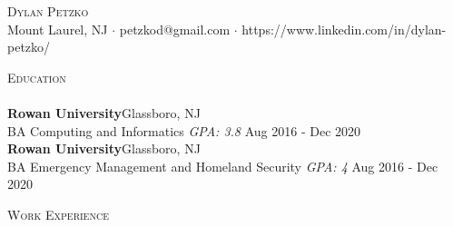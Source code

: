 \documentclass[letterpaper,11pt]{article}
\newcommand{\lineunder} {
    \vspace*{-8pt} \\
    \hspace*{-18pt} \hrulefill \\
}
\newcommand{\header} [1] {
    {\hspace*{-18pt}\vspace*{6pt} \textsc{#1}}
    \vspace*{-6pt} \lineunder
}
\begin{document}
\vspace*{-40pt}

    

\vspace*{-10pt}
\begin{center}
	{\Huge \scshape {Dylan Petzko}}\\
	Mount Laurel, NJ $\cdot$ petzkod@gmail.com $\cdot$ https://www.linkedin.com/in/dylan-petzko/\\
\end{center}

\header{Education}
\textbf{Rowan University}\hfill Glassboro, NJ\\
BA Computing and Informatics \textit{GPA: 3.8} \hfill Aug 2016 - Dec 2020\\
\vspace{2mm}
\textbf{Rowan University}\hfill Glassboro, NJ\\
BA Emergency Management and Homeland Security \textit{GPA: 4} \hfill Aug 2016 - Dec 2020\\
\vspace{2mm}

\header{Work Experience}
\vspace{1mm}
\end{document}
